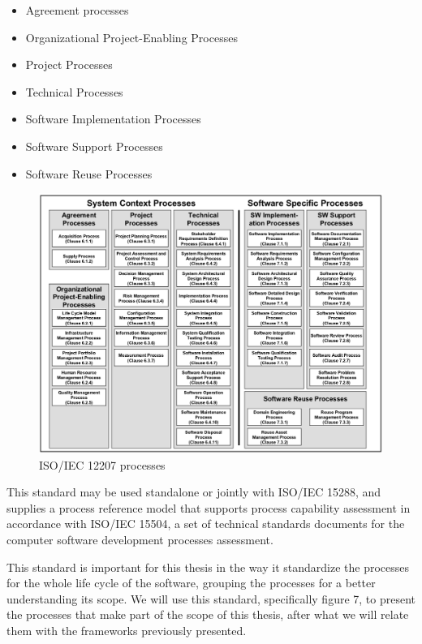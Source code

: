 \begin{itemize}
  \item Agreement processes
  \item Organizational Project-Enabling Processes
  \item Project Processes
  \item Technical Processes
  \item Software Implementation Processes
  \item Software Support Processes
  \item Software Reuse Processes 
\end{itemize}

 
\begin{figure}[t!]
\centering
\includegraphics[width=\textwidth]{img/ISO12207Processes.png}
\caption{ISO/IEC 12207 processes}
\end{figure}

This standard may be used standalone or jointly with ISO/IEC 15288, and supplies a process reference model that supports process capability assessment in accordance with ISO/IEC 15504, a set of technical standards documents for the computer software development processes assessment.\par
This standard is important for this thesis in the way it standardize the processes for the whole life cycle of the software, grouping the processes for a better understanding its scope. We will use this standard, specifically figure 7, to present the processes that make part of the scope of this thesis, after what we will relate them with the frameworks previously presented. 


